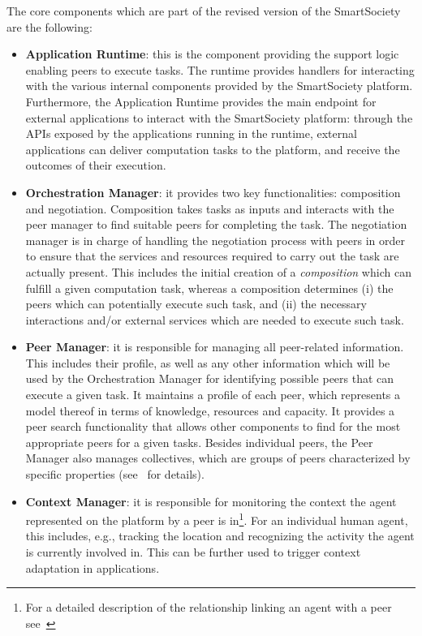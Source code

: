 The core components which are part of the revised version of the SmartSociety are the following:
\begin{itemize}
\item \textbf{Application Runtime}: this is the component providing the support logic enabling peers to execute tasks. The runtime provides handlers for interacting with the various internal components provided by the SmartSociety platform. Furthermore, the Application Runtime provides the main endpoint for external applications to interact with the SmartSociety platform: through the APIs exposed by the applications running in the runtime, external applications can deliver computation tasks to the platform, and receive the  outcomes of their execution. 

\item \textbf{Orchestration Manager}: it provides two key functionalities: composition and negotiation. Composition takes tasks as
inputs and interacts with the peer manager to find suitable peers for completing the task. The negotiation manager is in charge of handling the negotiation process with peers in order to ensure that the services and resources required to carry out the task are actually present. This includes the initial creation of a \textit{composition} which can fulfill a given computation task, whereas a composition determines (i) the peers which can potentially execute such task, and (ii) the necessary interactions and/or external services which are needed to execute such task. 

\item \textbf{Peer Manager}: it is responsible for managing all peer-related information. This includes their profile, as well as any other information which will be used by the Orchestration Manager for identifying possible peers that can execute a given task.  It maintains a profile of each peer, which
represents a model thereof in terms of knowledge, resources and
capacity. It provides a peer search functionality that allows other
components to find for the most appropriate peers for a given tasks.  Besides individual peers, the Peer Manager also manages collectives, which are groups of peers characterized by specific properties (see~\cite{D4.2} for details).

\item \textbf{Context Manager}: it is responsible for monitoring the context the agent represented on the platform by a peer is in\footnote{For a detailed description of the relationship linking an agent with a peer see~\cite{D2.2}}. For an individual human agent, this includes, e.g., tracking the location and recognizing the activity the agent is currently involved in. This can be further used to trigger context adaptation in applications. 


\end{itemize}

